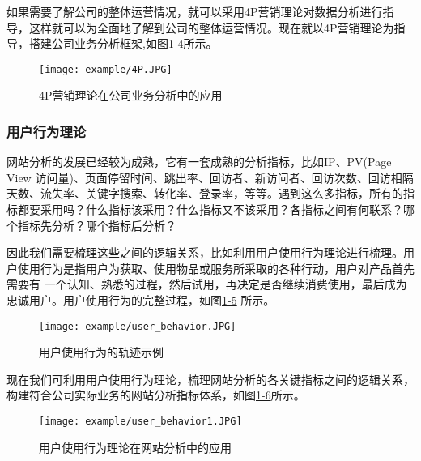 如果需要了解公司的整体运营情况，就可以采用4P营销理论对数据分析进行指导，这样就可以为全面地了解到公司的整体运营情况。现在就以4P营销理论为指导，搭建公司业务分析框架,如图\href{fig:1-4}{1-4}所示。

\begin{figure}[!htp]

\centering
\texttt{[image: example/4P.JPG]}
\caption{4P营销理论在公司业务分析中的应用}
\label{fig:1-4}

\end{figure}

\subsubsection{用户行为理论}

网站分析的发展已经较为成熟，它有一套成熟的分析指标，比如IP、PV(Page View 访问量)、页面停留时间、跳出率、回访者、新访问者、回访次数、回访相隔天数、流失率、关键字搜索、转化率、登录率，等等。遇到这么多指标，所有的指标都要采用吗？什么指标该采用？什么指标又不该采用？各指标之间有何联系？哪个指标先分析？哪个指标后分析？

因此我们需要梳理这些之间的逻辑关系，比如利用用户使用行为理论进行梳理。用户使用行为是指用户为获取、使用物品或服务所采取的各种行动，用户对产品首先需要有
一个认知、熟悉的过程，然后试用，再决定是否继续消费使用，最后成为忠诚用户。用户使用行为的完整过程，如图\href{fig:1-5}{1-5} 所示。

\begin{figure}[!htp]

\centering
\texttt{[image: example/user\_behavior.JPG]}
\caption{用户使用行为的轨迹示例}
\label{fig:1-5}

\end{figure}

现在我们可利用用户使用行为理论，梳理网站分析的各关键指标之间的逻辑关系，构建符合公司实际业务的网站分析指标体系，如图\href{fig:1-6}{1-6}所示。 \\

\begin{figure}[!htp]

\centering
\texttt{[image: example/user\_behavior1.JPG]}
\caption{用户使用行为理论在网站分析中的应用}
\label{fig:1-6}

\end{figure}

